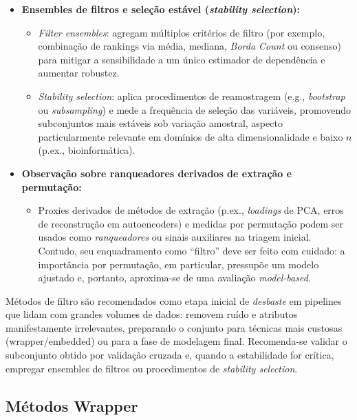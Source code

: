 \begin{itemize}
    \item \textbf{Ensembles de filtros e seleção estável (\emph{stability selection}):}
    \begin{itemize}
        \item \emph{Filter ensembles}: agregam múltiplos critérios de filtro (por exemplo, combinação de rankings via média, mediana, \emph{Borda Count} ou consenso) para mitigar a sensibilidade a um único estimador de dependência e aumentar robustez. \cite{KHAIRE20221060,Theng2024}
        \item \emph{Stability selection}: aplica procedimentos de reamostragem (e.g., \emph{bootstrap} ou \emph{subsampling}) e mede a frequência de seleção das variáveis, promovendo subconjuntos mais estáveis sob variação amostral, aspecto particularmente relevante em domínios de alta dimensionalidade e baixo $n$ (p.ex., bioinformática). \cite{KHAIRE20221060,Theng2024}
    \end{itemize}

    \item \textbf{Observação sobre ranqueadores derivados de extração e permutação:}
    \begin{itemize}
        \item Proxies derivados de métodos de extração (p.ex., \emph{loadings} de PCA, erros de reconstrução em autoencoders) e medidas por permutação podem ser usados como \emph{ranqueadores} ou sinais auxiliares na triagem inicial. Contudo, seu enquadramento como ``filtro'' deve ser feito com cuidado: a importância por permutação, em particular, pressupõe um modelo ajustado e, portanto, aproxima-se de uma avaliação \emph{model-based}. \cite{BARBIERI2024123667,Theng2024,EBRAHIMIWARKIANI2025129372}
    \end{itemize}
\end{itemize}

\bigskip
Métodos de filtro são recomendados como etapa inicial de \emph{desbaste} em pipelines que lidam com grandes volumes de dados: removem ruído e atributos manifestamente irrelevantes, preparando o conjunto para técnicas mais custosas (wrapper/embedded) ou para a fase de modelagem final. Recomenda-se validar o subconjunto obtido por validação cruzada e, quando a estabilidade for crítica, empregar ensembles de filtros ou procedimentos de \emph{stability selection}. \cite{KHAIRE20221060,Theng2024}

\subsection{Métodos Wrapper}\label{subsec:wrapper}

